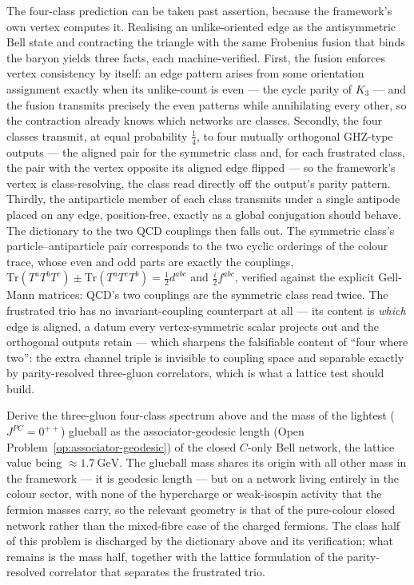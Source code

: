 The four-class prediction can be taken past assertion, because the framework's own vertex computes
it. Realising an unlike-oriented edge as the antisymmetric Bell state and contracting the triangle
with the same Frobenius fusion that binds the baryon yields three facts, each machine-verified.
First, the fusion enforces vertex consistency by itself: an edge pattern arises from some
orientation assignment exactly when its unlike-count is even --- the cycle parity of $K_3$ --- and
the fusion transmits precisely the even patterns while annihilating every other, so the contraction
already knows which networks are classes. Secondly, the four classes transmit, at equal probability
$\tfrac14$, to four mutually orthogonal $\mathrm{GHZ}$-type outputs --- the aligned pair for the
symmetric class and, for each frustrated class, the pair with the vertex opposite its aligned edge
flipped --- so the framework's vertex is class-resolving, the class read directly off the output's
parity pattern. Thirdly, the antiparticle member of each class transmits under a single antipode
placed on any edge, position-free, exactly as a global conjugation should behave. The dictionary to
the two QCD couplings then falls out. The symmetric class's particle--antiparticle pair corresponds
to the two cyclic orderings of the colour trace, whose even and odd parts are exactly the
couplings, $\mathrm{Tr}(T^aT^bT^c) \pm \mathrm{Tr}(T^aT^cT^b) = \tfrac12 d^{abc}$ and
$\tfrac{i}{2} f^{abc}$, verified against the explicit Gell-Mann matrices: QCD's two couplings are
the symmetric class read twice. The frustrated trio has no invariant-coupling counterpart at all
--- its content is \emph{which} edge is aligned, a datum every vertex-symmetric scalar projects
out and the orthogonal outputs retain --- which sharpens the falsifiable content of ``four where
two'': the extra channel triple is invisible to coupling space and separable exactly by
parity-resolved three-gluon correlators, which is what a lattice test should build.

\begin{openproblem}\label{op:glueball-spectrum}
Derive the three-gluon four-class spectrum above and the mass of the lightest ($J^{PC} = 0^{++}$)
glueball as the associator-geodesic length (Open Problem~\ref{op:associator-geodesic}) of the closed
$C$-only Bell network, the lattice value being $\approx 1.7\ \mathrm{GeV}$. The glueball mass shares
its origin with all other mass in the framework --- it is geodesic length --- but on a network living
entirely in the colour sector, with none of the hypercharge or weak-isospin activity that the fermion
masses carry, so the relevant geometry is that of the pure-colour closed network rather than the
mixed-fibre case of the charged fermions. The class half of this problem is discharged by the
dictionary above and its verification; what remains is the mass half, together with the lattice
formulation of the parity-resolved correlator that separates the frustrated trio.
\end{openproblem}

